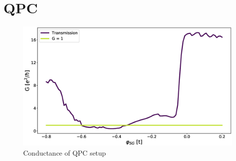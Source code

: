 \documentclass[a4paper]{article}
\begin{document}

\section{QPC}

\begin{figure}
\centering
\includegraphics[width=\textwidth]{qpc-conductance}
\caption{Conductance of QPC setup}
\end{figure}
\end{document}
